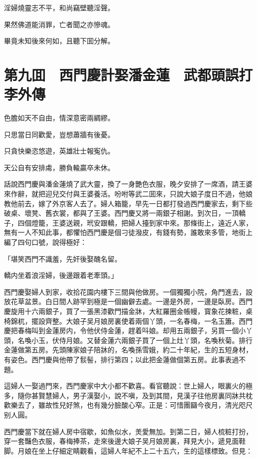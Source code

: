 淫婦燒靈志不平，和尚竊壁聽淫聲。

果然佛道能消罪，亡者聞之亦慘魂。

畢竟未知後來何如，且聽下囬分解。

\chapter*{第九囬　西門慶計娶潘金蓮　武都頭誤打李外傳}

色膽如天不自由，情深意密兩綢繆。

只思當日同歡愛，豈想蕭牆有後憂。

只貪快樂恣悠遊，英雄壯士報寃仇。

天公自有安排䖏，勝負輸贏卒未休。

話說西門慶與潘金蓮燒了武大靈，換了一身艷色衣服，晚夕安排了一席酒，請王婆來作辭，就把迎兒交付與王婆養活。吩咐等武二囬來，只說大娘子度日不過，他娘教他前去，嫁了外京客人去了。婦人箱籠，早先一日都打發過西門慶家去，剩下些破桌、壞凳、舊衣裳，都與了王婆。西門慶又將一兩銀子相謝。到次日，一頂轎子，四個燈籠，王婆送親，玳安跟轎，把婦人擡到家中來。那條街上，遠近人家，無有一人不知此事，都懼怕西門慶是個刁徒潑皮，有錢有勢，誰敢來多管，地街上編了四句口號，說得極好：

「堪笑西門不識羞，先奸後娶醜名留。

轎内坐着浪淫婦，後邊跟着老牽頭。」

西門慶娶婦人到家，收拾花園内樓下三間與他做房。一個獨獨小院，角門進去，設放花草盆景。白日間人跡罕到極是一個幽僻去處。一邊是外房，一邊是臥房。西門慶旋用十六兩銀子，買了一張黑漆歡門描金牀，大紅羅圈金帳幔，寳象花揀粧，桌椅錦杌，擺設齊整。大娘子吴月娘房裏使着兩個丫頭，一名春梅，一名玉簫。西門慶把春梅叫到金蓮房内，令他伏侍金蓮，趕着呌娘。却用五兩銀子，另買一個小丫頭，名喚小玉，伏侍月娘。又替金蓮六兩銀子買了一個上灶丫頭，名喚秋菊。排行金蓮做第五房。先頭陳家娘子陪牀的，名喚孫雪娥，約二十年紀，生的五短身材，有姿色。西門慶與他帶了䯼髻，排行第四；以此把金蓮做個第五房。此事表過不題。

這婦人一娶過門來，西門慶家中大小都不歡喜。看官聽說：世上婦人，眼裏火的極多，隨你甚賢慧婦人，男子漢娶小，說不嗔，及到其間，見漢子往他房裏同牀共枕歡樂去了，雖故性兒好煞，也有幾分臉酸心窄。正是：可惜團圝今夜月，清光咫尺别人圓。

西門慶當下就在婦人房中宿歇，如魚似水，羙愛無加。到第二日，婦人梳粧打扮，穿一套豔色衣服，春梅捧茶，走來後邊大娘子吴月娘房裏，拜見大小，遞見面鞋脚。月娘在坐上仔細定睛觀看，這婦人年紀不上二十五六，生的這樣標致。但見：

